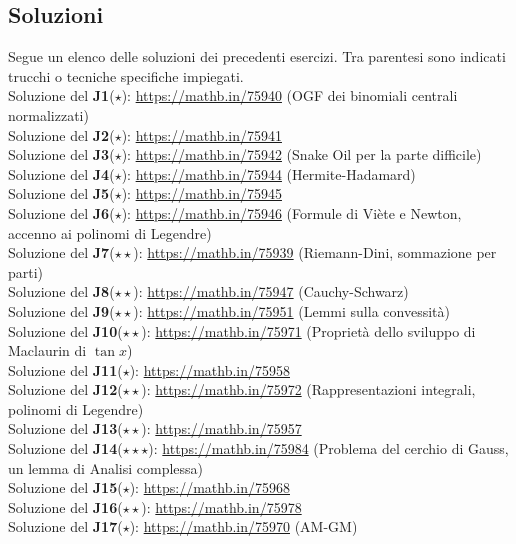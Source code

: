 \documentclass[a4paper,twoside]{article}
\theoremstyle{definition}
\numberwithin{theorem}{section}
\begin{document}
\subsection{Soluzioni}
Segue un elenco delle soluzioni dei precedenti esercizi. Tra parentesi sono indicati trucchi o tecniche specifiche impiegati.\\

Soluzione del \textbf{J1}($\star$): \url{https://mathb.in/75940} (OGF dei binomiali centrali normalizzati)\\
Soluzione del \textbf{J2}($\star$): \url{https://mathb.in/75941} \\
Soluzione del \textbf{J3}($\star$): \url{https://mathb.in/75942} (Snake Oil per la parte difficile)\\
Soluzione del \textbf{J4}($\star$): \url{https://mathb.in/75944} (Hermite-Hadamard)\\
Soluzione del \textbf{J5}($\star$): \url{https://mathb.in/75945} \\
Soluzione del \textbf{J6}($\star$): \url{https://mathb.in/75946} (Formule di Viète e Newton, accenno ai polinomi di Legendre)\\
Soluzione del \textbf{J7}($\star\star$): \url{https://mathb.in/75939} (Riemann-Dini, sommazione per parti) \\
Soluzione del \textbf{J8}($\star\star$): \url{https://mathb.in/75947} (Cauchy-Schwarz)\\
Soluzione del \textbf{J9}($\star\star$): \url{https://mathb.in/75951} (Lemmi sulla convessità) \\
Soluzione del \textbf{J10}($\star\star$): \url{https://mathb.in/75971} (Proprietà dello sviluppo di Maclaurin di $\tan x$)\\
Soluzione del \textbf{J11}($\star$): \url{https://mathb.in/75958} \\
Soluzione del \textbf{J12}($\star\star$): \url{https://mathb.in/75972} (Rappresentazioni integrali, polinomi di Legendre)\\
Soluzione del \textbf{J13}($\star\star$): \url{https://mathb.in/75957} \\
Soluzione del \textbf{J14}($\star\star\star$): \url{https://mathb.in/75984} (Problema del cerchio di Gauss, un lemma di Analisi complessa)\\
Soluzione del \textbf{J15}($\star$): \url{https://mathb.in/75968} \\
Soluzione del \textbf{J16}($\star\star$): \url{https://mathb.in/75978} \\
Soluzione del \textbf{J17}($\star$): \url{https://mathb.in/75970} (AM-GM)\\
\end{document}
